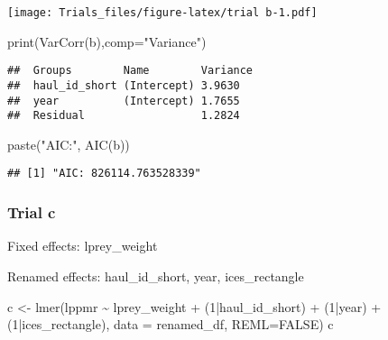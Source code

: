 \documentclass[
]{article}
\newenvironment{Shaded}{\begin{snugshade}}{\end{snugshade}}
\newcommand{\AttributeTok}[1]{\textcolor[rgb]{0.77,0.63,0.00}{#1}}
\newcommand{\ConstantTok}[1]{\textcolor[rgb]{0.00,0.00,0.00}{#1}}
\newcommand{\DecValTok}[1]{\textcolor[rgb]{0.00,0.00,0.81}{#1}}
\newcommand{\FunctionTok}[1]{\textcolor[rgb]{0.00,0.00,0.00}{#1}}
\newcommand{\NormalTok}[1]{#1}
\newcommand{\OtherTok}[1]{\textcolor[rgb]{0.56,0.35,0.01}{#1}}
\newcommand{\SpecialCharTok}[1]{\textcolor[rgb]{0.00,0.00,0.00}{#1}}
\newcommand{\StringTok}[1]{\textcolor[rgb]{0.31,0.60,0.02}{#1}}
\begin{document}
\texttt{[image: Trials\_files/figure-latex/trial b-1.pdf]}

\begin{Shaded}
\begin{Highlighting}[]
\FunctionTok{print}\NormalTok{(}\FunctionTok{VarCorr}\NormalTok{(b),}\AttributeTok{comp=}\StringTok{"Variance"}\NormalTok{)}
\end{Highlighting}
\end{Shaded}

\begin{verbatim}
##  Groups        Name        Variance
##  haul_id_short (Intercept) 3.9630  
##  year          (Intercept) 1.7655  
##  Residual                  1.2824
\end{verbatim}

\begin{Shaded}
\begin{Highlighting}[]
\FunctionTok{paste}\NormalTok{(}\StringTok{"AIC:"}\NormalTok{, }\FunctionTok{AIC}\NormalTok{(b))}
\end{Highlighting}
\end{Shaded}

\begin{verbatim}
## [1] "AIC: 826114.763528339"
\end{verbatim}

\hypertarget{trial-c}{%
\subsubsection{Trial c}\label{trial-c}}

Fixed effects: lprey\_weight

Renamed effects: haul\_id\_short, year, ices\_rectangle

\begin{Shaded}
\begin{Highlighting}[]
\NormalTok{c }\OtherTok{\textless{}{-}} \FunctionTok{lmer}\NormalTok{(lppmr }\SpecialCharTok{\textasciitilde{}}\NormalTok{ lprey\_weight }\SpecialCharTok{+}\NormalTok{ (}\DecValTok{1}\SpecialCharTok{|}\NormalTok{haul\_id\_short) }\SpecialCharTok{+}\NormalTok{ (}\DecValTok{1}\SpecialCharTok{|}\NormalTok{year) }\SpecialCharTok{+}\NormalTok{ (}\DecValTok{1}\SpecialCharTok{|}\NormalTok{ices\_rectangle), }\AttributeTok{data =}\NormalTok{ renamed\_df, }\AttributeTok{REML=}\ConstantTok{FALSE}\NormalTok{)}
\NormalTok{c}
\end{Highlighting}
\end{Shaded}
\end{document}
